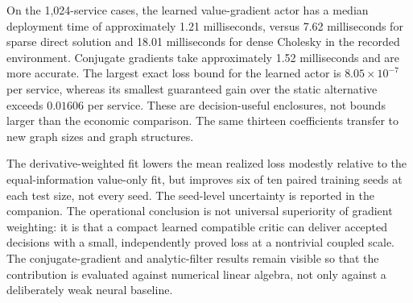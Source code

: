 On the 1,024-service cases, the learned value-gradient actor has a median deployment time of approximately 1.21 milliseconds, versus 7.62 milliseconds for sparse direct solution and 18.01 milliseconds for dense Cholesky in the recorded environment. Conjugate gradients take approximately 1.52 milliseconds and are more accurate. The largest exact loss bound for the learned actor is $8.05\times10^{-7}$ per service, whereas its smallest guaranteed gain over the static alternative exceeds $0.01606$ per service. These are decision-useful enclosures, not bounds larger than the economic comparison. The same thirteen coefficients transfer to new graph sizes and graph structures.

The derivative-weighted fit lowers the mean realized loss modestly relative to the equal-information value-only fit, but improves six of ten paired training seeds at each test size, not every seed. The seed-level uncertainty is reported in the companion. The operational conclusion is not universal superiority of gradient weighting: it is that a compact learned compatible critic can deliver accepted decisions with a small, independently proved loss at a nontrivial coupled scale. The conjugate-gradient and analytic-filter results remain visible so that the contribution is evaluated against numerical linear algebra, not only against a deliberately weak neural baseline.
